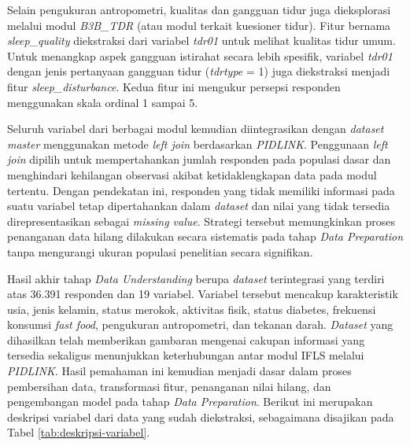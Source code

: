 Selain pengukuran antropometri, kualitas dan gangguan tidur juga dieksplorasi melalui modul \textit{B3B\_TDR} (atau modul terkait kuesioner tidur). Fitur bernama \textit{sleep\_quality} diekstraksi dari variabel \textit{tdr01} untuk melihat kualitas tidur umum. Untuk menangkap aspek gangguan istirahat secara lebih spesifik, variabel \textit{tdr01} dengan jenis pertanyaan gangguan tidur (\textit{tdrtype} = 1) juga diekstraksi menjadi fitur \textit{sleep\_disturbance}. Kedua fitur ini mengukur persepsi responden menggunakan skala ordinal 1 sampai 5.

Seluruh variabel dari berbagai modul kemudian diintegrasikan dengan \textit{dataset master} menggunakan metode \textit{left join} berdasarkan \textit{PIDLINK}. Penggunaan \textit{left join} dipilih untuk mempertahankan jumlah responden pada populasi dasar dan menghindari kehilangan observasi akibat ketidaklengkapan data pada modul tertentu. Dengan pendekatan ini, responden yang tidak memiliki informasi pada suatu variabel tetap dipertahankan dalam \textit{dataset} dan nilai yang tidak tersedia direpresentasikan sebagai \textit{missing value}. Strategi tersebut memungkinkan proses penanganan data hilang dilakukan secara sistematis pada tahap \textit{Data Preparation} tanpa mengurangi ukuran populasi penelitian secara signifikan.

Hasil akhir tahap \textit{Data Understanding} berupa \textit{dataset} terintegrasi yang terdiri atas 36.391 responden dan 19 variabel. Variabel tersebut mencakup karakteristik usia, jenis kelamin, status merokok, aktivitas fisik, status diabetes, frekuensi konsumsi \textit{fast food}, pengukuran antropometri, dan tekanan darah. \textit{Dataset} yang dihasilkan telah memberikan gambaran mengenai cakupan informasi yang tersedia sekaligus menunjukkan keterhubungan antar modul IFLS melalui \textit{PIDLINK}. Hasil pemahaman ini kemudian menjadi dasar dalam proses pembersihan data, transformasi fitur, penanganan nilai hilang, dan pengembangan model pada tahap \textit{Data Preparation}. Berikut ini merupakan deskripsi variabel dari data yang sudah diekstraksi, sebagaimana disajikan pada Tabel \ref{tab:deskripsi-variabel}.

